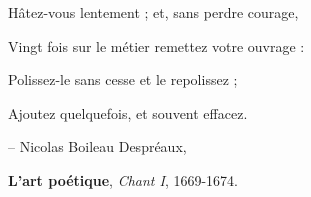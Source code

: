 \leavevmode
\vfill 


\begin{flushright}
%	
%	
%	
%	
	
	Hâtez-vous lentement ; et, sans perdre courage,
	
	Vingt fois sur le métier remettez votre ouvrage :
	
	Polissez-le sans cesse et le repolissez ;
	
	Ajoutez quelquefois, et souvent effacez. 
	
	\medskip
	
	{\footnotesize  -- Nicolas Boileau Despréaux, 
	
	\textbf{L'art poétique}, \textit{Chant I}, 1669-1674.}
	
\end{flushright}


\vfill
